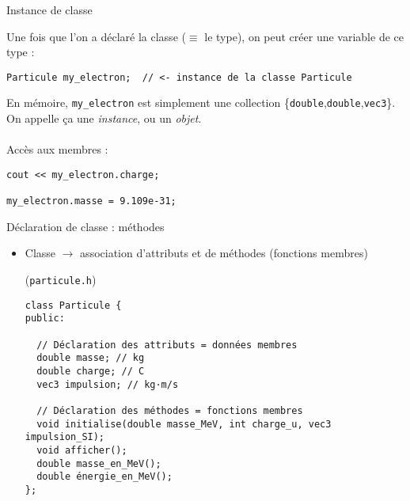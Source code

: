 \documentclass[c]{beamer}
\newcommand{\inline}[1]{\texttt{#1}}
\begin{document}

\begin{frame}[fragile]{Instance de classe}

Une fois que l'on a déclaré la classe ($\equiv$ le type), on peut créer une variable de ce type :
\begin{verbatim}
Particule my_electron;  // <- instance de la classe Particule
\end{verbatim}
En mémoire, \inline{my_electron} est simplement une collection \{\inline{double},\inline{double},\inline{vec3}\}. On appelle ça une \emph{instance}, ou un \emph{objet}.\\\ \\
\pause
Accès aux membres :
\begin{verbatim}
cout << my_electron.charge;

my_electron.masse = 9.109e-31;
\end{verbatim}

\end{frame}


\begin{frame}[fragile]{Déclaration de classe : méthodes}

\begin{itemize}
\item Classe \(\rightarrow\) association d'attributs et de méthodes (fonctions membres)
\begin{cbox}[][lwuc](\texttt{particule.h})
\begin{verbatim}
class Particule {
public:

  // Déclaration des attributs = données membres
  double masse; // kg
  double charge; // C
  vec3 impulsion; // kg·m/s

  // Déclaration des méthodes = fonctions membres
  void initialise(double masse_MeV, int charge_u, vec3 impulsion_SI);
  void afficher();
  double masse_en_MeV();
  double énergie_en_MeV();
};
\end{verbatim}
\end{cbox}
\end{itemize}

\end{frame}
\end{document}
